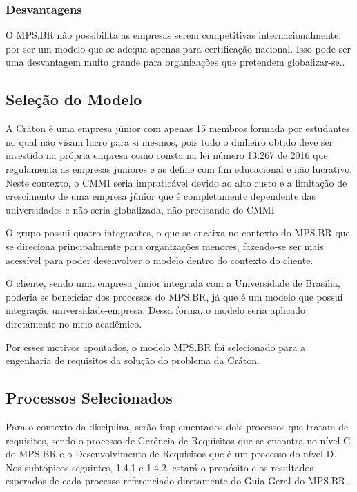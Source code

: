   \subsubsection{Desvantagens}

    O MPS.BR não possibilita as empresas serem competitivas internacionalmente,
    por ser um modelo que se adequa apenas para certificação nacional. Isso pode
    ser uma desvantagem muito grande para organizações que pretendem
    globalizar-se.\cite{francis2012}.

  \subsection{Seleção do Modelo}

    A Cráton é uma empresa júnior com apenas 15 membros formada por estudantes no qual
    não visam lucro para si mesmos, pois todo o dinheiro obtido deve ser investido
    na própria empresa como consta na lei número 13.267 de 2016 que regulamenta as empresas
    juniores e as define com fim educacional e não lucrativo. Neste contexto, o CMMI seria
    impraticável devido ao alto custo e a limitação de crescimento de uma empresa júnior que é
    completamente dependente das universidades e não seria globalizada, não precisando do CMMI

    O grupo possui quatro integrantes, o que se encaixa no contexto do MPS.BR que se direciona
    principalmente para organizações menores, fazendo-se ser mais acessível para poder desenvolver
    o modelo dentro do contexto do cliente.

    O cliente, sendo uma empresa júnior integrada com a Universidade de Brasília, poderia se
    beneficiar dos processos do MPS.BR, já que é um modelo que possui integração universidade-empresa.
    Dessa forma, o modelo seria aplicado diretamente no meio acadêmico.

    Por esses motivos apontados, o modelo MPS.BR foi selecionado para a engenharia de requisitos da
    solução do problema da Cráton.

  \subsection{Processos Selecionados}

    Para o contexto da disciplina, serão implementados dois processos que tratam de
    requisitos, sendo o processo de Gerência de Requisitos que se encontra no nível
    G do MPS.BR e o Desenvolvimento de Requisitos que é um processo do nível D. Nos
    subtópicos seguintes, 1.4.1 e 1.4.2, estará o propósito e os resultados esperados
    de cada processo referenciado diretamente do Guia Geral do MPS.BR.\cite{softexmps}.


